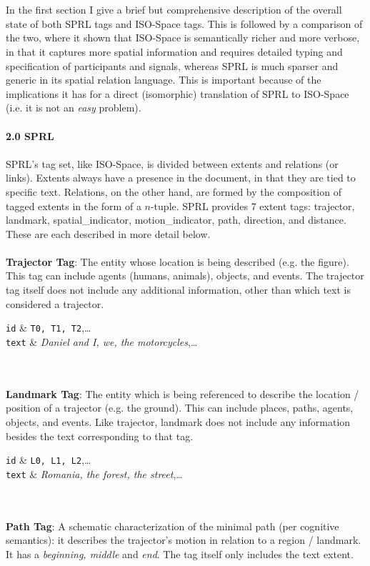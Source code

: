 \documentclass{article}
\begin{document}
\\
\\
In the first section I give a brief but comprehensive description of the overall state of both SPRL tags and ISO-Space tags.  This is followed by a comparison of the two, where it shown that ISO-Space is semantically richer and more verbose, in that it captures more spatial information and requires detailed typing and specification of participants and signals, whereas SPRL is much sparser and generic in its spatial relation language.  This is important because of the implications it has for a direct (isomorphic) translation of SPRL to ISO-Space (i.e. it is not an \emph{easy} problem).  
\\
\\
{\large {\bf 2.0 SPRL}}
\\
\\
SPRL's tag set, like ISO-Space, is divided between extents and relations (or links).  Extents always have a presence in the document, in that they are tied to specific text.  Relations, on the other hand, are formed by the composition of tagged extents in the form of a $n$-tuple.  SPRL provides 7 extent tags: {\sc trajector}, {\sc landmark}, {\sc spatial\_indicator}, {\sc motion\_indicator}, {\sc path}, {\sc direction}, and {\sc distance}.  These are each described in more detail below.  
\\
\\
{\bf Trajector Tag}: The entity whose location is being described (e.g. the figure).  This tag can include agents (humans, animals), objects, and events.  The {\sc trajector} tag itself does not include any additional information, other than which text is considered a {\sc trajector}.  

\begin{attributes}
{\tt id} 			&	\texttt{T0, T1, T2},\ldots\\
\hline
{\tt text}	&	\emph{Daniel and I, we, the motorcycles},\ldots \\
\end{attributes}
\\
\\
{\bf Landmark Tag}: The entity which is being referenced to describe the location / position of a {\sc trajector} (e.g. the ground).  This can include places, paths, agents, objects, and events.  Like {\sc trajector}, {\sc landmark} does not include any information besides the text corresponding to that tag.

\begin{attributes}
{\tt id} 			&	\texttt{L0, L1, L2},\ldots\\
\hline
{\tt text}	&	\emph{Romania, the forest, the street},\ldots \\
\end{attributes}
\\
\\
{\bf Path Tag}: A schematic characterization of the minimal path (per cognitive semantics): it describes the trajector's motion in relation to a region / landmark.  It has a \emph{beginning, middle} and \emph{end}.  The tag itself only includes the text extent.  
\end{document}
